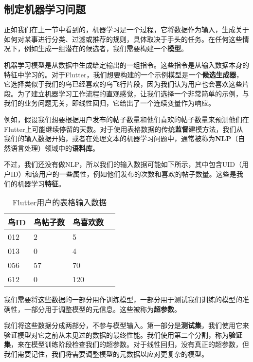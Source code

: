 \documentclass[Chinese, 11pt, table]{diazessay} %
\begin{document}
\begin{CJK}{UTF8}{gbsn}
\begin{sloppypar}
\subsection{制定机器学习问题}

正如我们在上一节中看到的，机器学习是一个过程，它将数据作为输入，生成关于如何对某事进行分类、过滤或推荐的规则，具体取决于手头的任务。在任何这些情况下，例如生成一组潜在的候选者，我们需要构建一个\textbf{模型}。

机器学习模型是从数据中生成给定输出的一组指令。这些指令是从输入数据本身的特征中学习的。对于Flutter，我们想要构建的一个示例模型是一个\textbf{候选生成器}，它选择类似于我们的鸟已经喜欢的鸟飞行片段，因为我们认为用户也会喜欢这些片段。为了建立机器学习工作流程的直观感觉，让我们选择一个非常简单的示例，与我们的业务问题无关，即线性回归，它给出了一个连续变量作为响应。

例如，假设我们想要根据用户发布的帖子数量和他们喜欢的帖子数量来预测他们在Flutter上可能继续停留的天数。对于使用表格数据的传统\textbf{监督}建模方法，我们从我们的输入数据开始，或者在处理文本的机器学习问题中，通常被称为\textbf{NLP}（自然语言处理）领域中的\textbf{语料库}。

不过，我们还没有做NLP，所以我们的输入数据可能如下所示，其中包含UID（用户ID）和该用户的一些属性，例如他们发布的次数和喜欢的帖子数量。这些是我们的机器学习\textbf{特征}。

\begin{table}[H]
  \centering
    \caption{Flutter用户的表格输入数据}
\begin{tabular}{|l|l|l|l|}
\hline
\rowcolor[HTML]{D5E7F7}
鸟ID & 鸟帖子数 & 鸟喜欢数 \\ \hline
012 	 & 2  		   	 & 5  		 \\ \hline
013 	 & 0  		   	 & 4  		 \\ \hline
056 	 & 57 		   	 & 70 		 \\ \hline
612 	 & 0  				 & 120		 \\ \hline
\end{tabular}
\end{table}

我们需要将这些数据的一部分用作训练模型，一部分用于测试我们训练的模型的准确性，一部分用于调整模型的元信息。这些被称为\textbf{超参数}。

我们将这些数据分成两部分，不参与模型输入。第一部分是\textbf{测试集}，我们使用它来验证模型对它之前从未见过的数据的最终性能。我们使用第二个分割，称为\textbf{验证集}，来在模型训练阶段检查我们的超参数。对于线性回归，没有真正的超参数，但我们需要记住，我们将需要调整模型的元数据以应对更复杂的模型。


\end{sloppypar}
\end{CJK}
\end{document}

